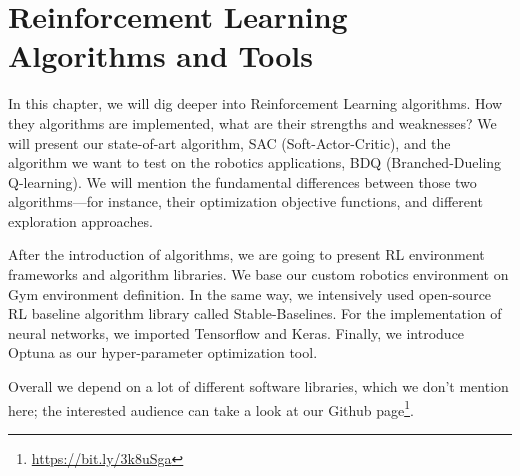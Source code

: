 \chapter{Reinforcement Learning Algorithms and Tools}\label{chapter:reinforcement_learning}

In this chapter, we will dig deeper into Reinforcement Learning algorithms. How they algorithms are implemented, what are their strengths and weaknesses? We will present our state-of-art algorithm, SAC (Soft-Actor-Critic), and the algorithm we want to test on the robotics applications, BDQ (Branched-Dueling Q-learning). We will mention the fundamental differences between those two algorithms—for instance, their optimization objective functions, and different exploration approaches. 

After the introduction of algorithms, we are going to present RL environment frameworks and algorithm libraries. We base our custom robotics environment on Gym environment definition. In the same way, we intensively used open-source RL baseline algorithm library called Stable-Baselines. For the implementation of neural networks, we imported Tensorflow and Keras. Finally, we introduce Optuna as our hyper-parameter optimization tool. 

Overall we depend on a lot of different software libraries, which we don’t mention here; the interested audience can take a look at our Github page\footnote{\url{https://bit.ly/3k8uSga}}.








% 